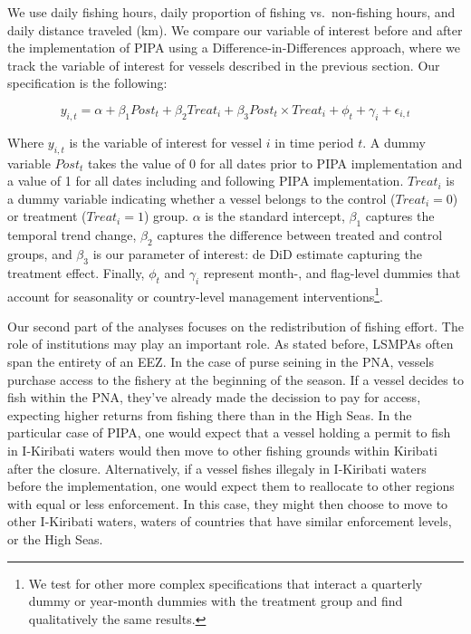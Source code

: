 \documentclass[11pt,]{article}
\let\rmarkdownfootnote\footnote%
\def\footnote{\protect\rmarkdownfootnote}
\begin{document}
We use daily fishing hours, daily proportion of fishing vs.~non-fishing
hours, and daily distance traveled (km). We compare our variable of
interest before and after the implementation of PIPA using a
Difference-in-Differences approach, where we track the variable of
interest for vessels described in the previous section. Our
specification is the following:

\[
y_{i,t} = \alpha + \beta_1 Post_t + \beta_2 Treat_i + \beta_3 Post_t \times Treat_i + \phi_t + \gamma_i + \epsilon_{i,t}
\]

Where \(y_{i,t}\) is the variable of interest for vessel \(i\) in time
period \(t\). A dummy variable \(Post_t\) takes the value of 0 for all
dates prior to PIPA implementation and a value of 1 for all dates
including and following PIPA implementation. \(Treat_i\) is a dummy
variable indicating whether a vessel belongs to the control
(\(Treat_i = 0\)) or treatment (\(Treat_i = 1\)) group. \(\alpha\) is
the standard intercept, \(\beta_1\) captures the temporal trend change,
\(\beta_2\) captures the difference between treated and control groups,
and \(\beta_3\) is our parameter of interest: de DiD estimate capturing
the treatment effect. Finally, \(\phi_t\) and \(\gamma_i\) represent
month-, and flag-level dummies that account for seasonality or
country-level management
interventions\footnote{We test for other more complex specifications that interact a quarterly dummy or year-month dummies with the treatment group and find qualitatively the same results.}.

Our second part of the analyses focuses on the redistribution of fishing
effort. The role of institutions may play an important role. As stated
before, LSMPAs often span the entirety of an EEZ. In the case of purse
seining in the PNA, vessels purchase access to the fishery at the
beginning of the season. If a vessel decides to fish within the PNA,
they've already made the decission to pay for access, expecting higher
returns from fishing there than in the High Seas. In the particular case
of PIPA, one would expect that a vessel holding a permit to fish in
I-Kiribati waters would then move to other fishing grounds within
Kiribati after the closure. Alternatively, if a vessel fishes illegaly
in I-Kiribati waters before the implementation, one would expect them to
reallocate to other regions with equal or less enforcement. In this
case, they might then choose to move to other I-Kiribati waters, waters
of countries that have similar enforcement levels, or the High Seas.
\end{document}

